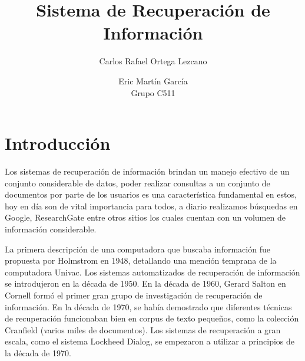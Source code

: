 \documentclass[runningheads,a4paper]{llncs}
\begin{document}
\mainmatter  %

\title{Sistema de Recuperación de Información}


%
%
\author{Carlos Rafael Ortega Lezcano \and Eric Martín García \\ Grupo C511}
%


%
%

\maketitle

\section{Introducción}

Los sistemas de recuperación de información brindan un manejo efectivo de un conjunto considerable de datos, poder realizar consultas a un conjunto de documentos por parte de los usuarios es una característica fundamental en estos, hoy en día son de vital importancia para todos, a diario realizamos búsquedas en Google, ResearchGate entre otros sitios los cuales cuentan con un volumen de información considerable. 

La primera descripción de una computadora que buscaba información fue propuesta por Holmstrom en 1948, detallando una mención temprana de la computadora Univac. Los sistemas automatizados de recuperación de información se introdujeron en la década de 1950. En la década de 1960, Gerard Salton en Cornell formó el primer gran grupo de investigación de recuperación de información. En la década de 1970, se había demostrado que diferentes técnicas de recuperación funcionaban bien en corpus de texto pequeños, como la colección Cranfield (varios miles de documentos). Los sistemas de recuperación a gran escala, como el sistema Lockheed Dialog, se empezaron a utilizar a principios de la década de 1970. 
\end{document}
